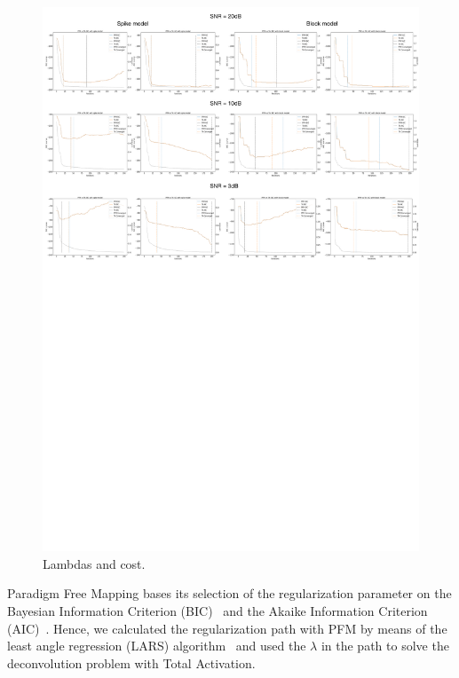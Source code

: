\begin{figure}[t!]
    \begin{center}
        \includegraphics[width=\textwidth]{figures/lambda_cost.pdf}
    \end{center}
    \caption{Lambdas and cost.}
\label{fig:lambdas}
\end{figure}

Paradigm Free Mapping bases its selection of the regularization parameter on the Bayesian Information Criterion (BIC)~\cite{schwarz1978estimating} and the Akaike Information Criterion (AIC)~\cite{akaike1998information}. Hence, we calculated the regularization path with PFM by means of the least angle regression (LARS) algorithm~\cite{efron2004least} and used the \(\lambda\) in the path to solve the deconvolution problem with Total Activation.

